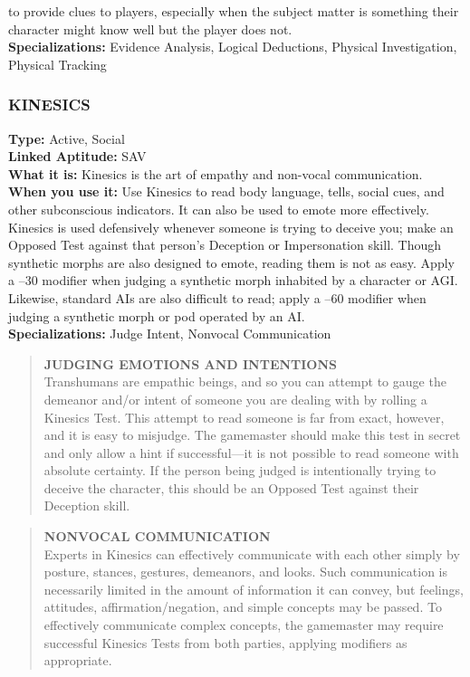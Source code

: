 to provide clues to players, especially when the subject matter is something their character might know well but the player does not. \\ \textbf{Specializations:} Evidence Analysis, Logical Deductions, Physical Investigation, Physical Tracking 

\subsubsection{KINESICS} \textbf{Type:} Active, Social \\ \textbf{Linked Aptitude:} SAV \\ \textbf{What it is:} Kinesics is the art of empathy and non-vocal communication. \\ \textbf{When you use it:} Use Kinesics to read body language, tells, social cues, and other subconscious indicators. It can also be used to emote more effectively. Kinesics is used defensively whenever someone is trying to deceive you; make an Opposed Test against that person’s Deception or Impersonation skill. Though synthetic morphs are also designed to emote, reading them is not as easy. Apply a –30 modifier when judging a synthetic morph inhabited by a character or AGI. Likewise, standard AIs are also difficult to read; apply a –60 modifier when judging a synthetic morph or pod operated by an AI. \\ \textbf{Specializations:} Judge Intent, Nonvocal Communication 

\begin{quotation} \textbf{JUDGING EMOTIONS AND INTENTIONS} \\ Transhumans are empathic beings, and so you can attempt to gauge the demeanor and/or intent of someone you are dealing with by rolling a Kinesics Test. This attempt to read someone is far from exact, however, and it is easy to misjudge. The gamemaster should make this test in secret and only allow a hint if successful—it is not possible to read someone with absolute certainty. If the person being judged is intentionally trying to deceive the character, this should be an Opposed Test against their Deception skill. \end{quotation} 

\begin{quotation} \textbf{NONVOCAL COMMUNICATION} \\ Experts in Kinesics can effectively communicate with each other simply by posture, stances, gestures, demeanors, and looks. Such communication is necessarily limited in the amount of information it can convey, but feelings, attitudes, affirmation/negation, and simple concepts may be passed. To effectively communicate complex concepts, the gamemaster may require successful Kinesics Tests from both parties, applying modifiers as appropriate. \end{quotation} 

